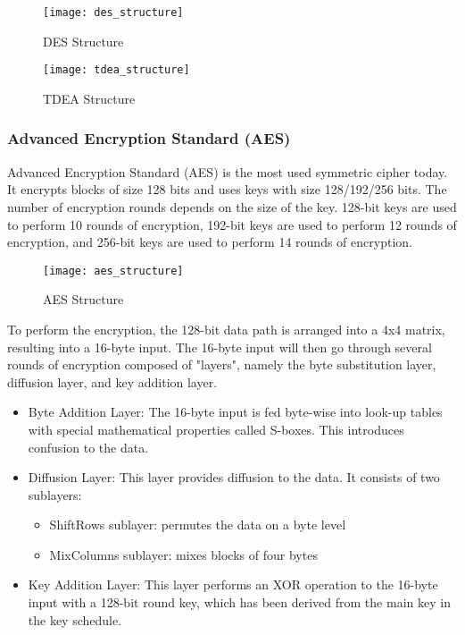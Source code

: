 \begin{figure}[H]
    \centering
    \texttt{[image: des\_structure]}
    \caption{DES Structure \cite{153}}
    \label{fig:des}
\end{figure}

\begin{figure}[H]
    \centering
    \texttt{[image: tdea\_structure]}
    \caption{TDEA Structure \cite{153}}
    \label{fig:tdea}
\end{figure}

\subsubsection{Advanced Encryption Standard (AES)}

Advanced Encryption Standard (AES) is the most used symmetric cipher today. It encrypts blocks of size 128 bits and uses keys with size 128/192/256 bits. The number of encryption rounds depends on the size of the key. 128-bit keys are used to perform 10 rounds of encryption, 192-bit keys are used to perform 12 rounds of encryption, and 256-bit keys are used to perform 14 rounds of encryption.

\begin{figure}[H]
    \centering
    \texttt{[image: aes\_structure]}
    \caption{AES Structure \cite{153}}
    \label{fig:aes}
\end{figure}

To perform the encryption, the 128-bit data path is arranged into a 4x4 matrix, resulting into a 16-byte input. The 16-byte input will then go through several rounds of encryption composed of "layers", namely the byte substitution layer, diffusion layer, and key addition layer. \cite{153}
\begin{itemize}
    \item Byte Addition Layer: The 16-byte input is fed byte-wise into look-up tables with special mathematical properties called S-boxes. This introduces confusion to the data.
    \item Diffusion Layer: This layer provides diffusion to the data. It consists of two sublayers:
    \begin{itemize}
        \item ShiftRows sublayer: permutes the data on a byte level
        \item MixColumns sublayer: mixes blocks of four bytes
    \end{itemize}
    \item Key Addition Layer: This layer performs an XOR operation to the 16-byte input with a 128-bit round key, which has been derived from the main key in the key schedule.
\end{itemize}

